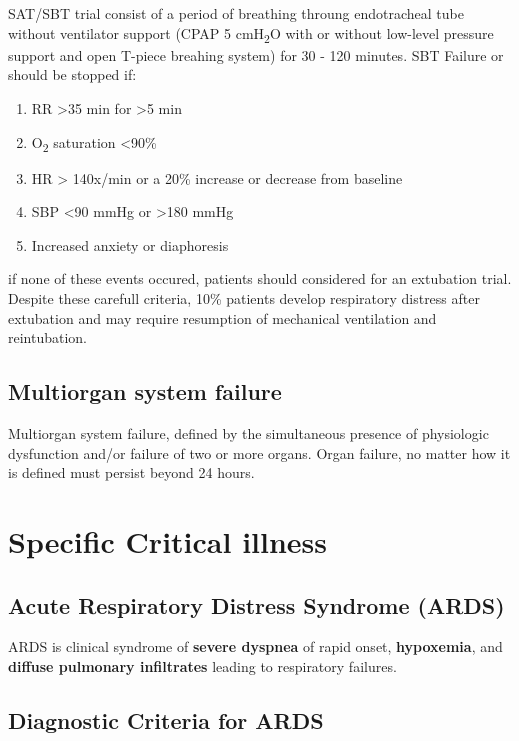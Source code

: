 \documentclass[
  letterpaper,
  DIV=11,
  numbers=noendperiod]{scrreprt}
\providecommand{\tightlist}{%
  \setlength{\itemsep}{0pt}\setlength{\parskip}{0pt}}\usepackage{longtable,booktabs,array}
\begin{document}
SAT/SBT trial consist of a period of breathing throung endotracheal tube
without ventilator support (CPAP 5 cmH\textsubscript{2}O with or without
low-level pressure support and open T-piece breahing system) for 30 -
120 minutes. SBT Failure or should be stopped if:

\begin{enumerate}
\def\labelenumi{\arabic{enumi}.}
\tightlist
\item
  RR \textgreater35 min for \textgreater5 min
\item
  O\textsubscript{2} saturation \textless90\%
\item
  HR \textgreater{} 140x/min or a 20\% increase or decrease from
  baseline
\item
  SBP \textless90 mmHg or \textgreater180 mmHg
\item
  Increased anxiety or diaphoresis
\end{enumerate}

if none of these events occured, patients should considered for an
extubation trial. Despite these carefull criteria, 10\% patients develop
respiratory distress after extubation and may require resumption of
mechanical ventilation and reintubation.

\subsection{Multiorgan system failure}\label{multiorgan-system-failure}

Multiorgan system failure, defined by the simultaneous presence of
physiologic dysfunction and/or failure of two or more organs. Organ
failure, no matter how it is defined must persist beyond 24 hours.

\section{Specific Critical illness}\label{specific-critical-illness}

\subsection{Acute Respiratory Distress Syndrome
(ARDS)}\label{acute-respiratory-distress-syndrome-ards}

ARDS is clinical syndrome of \textbf{severe dyspnea} of rapid onset,
\textbf{hypoxemia}, and \textbf{diffuse pulmonary infiltrates} leading
to respiratory failures.

\subsection{Diagnostic Criteria for
ARDS}\label{diagnostic-criteria-for-ards}
\end{document}
